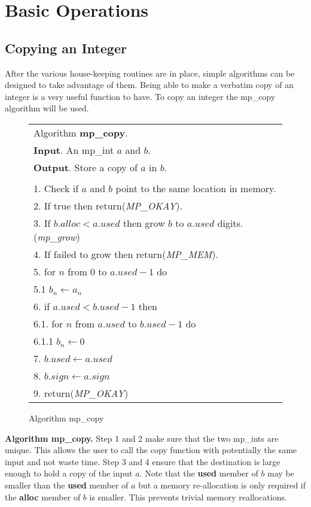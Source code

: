 \documentclass[b5paper]{book}
\begin{document}
\chapter{Basic Operations}
\section{Copying an Integer}
After the various house-keeping routines are in place, simple algorithms can be designed to take advantage of them.  Being able
to make a verbatim copy of an integer is a very useful function to have.  To copy an integer the mp\_copy algorithm will be used.

\newpage\begin{figure}[here]
\begin{center}
\begin{tabular}{l}
\hline Algorithm \textbf{mp\_copy}. \\
\textbf{Input}.  An mp\_int $a$ and $b$. \\
\textbf{Output}.  Store a copy of $a$ in $b$. \\
\hline \\
1.  Check if $a$ and $b$ point to the same location in memory. \\
2.  If true then return(\textit{MP\_OKAY}). \\
3.  If $b.alloc < a.used$ then grow $b$ to $a.used$ digits.  (\textit{mp\_grow}) \\
4.  If failed to grow then return(\textit{MP\_MEM}). \\
5.  for $n$ from 0 to $a.used - 1$ do \\
\hspace{3mm}5.1  $b_{n} \leftarrow a_{n}$ \\
6.  if $a.used < b.used - 1$ then \\ 
\hspace{3mm}6.1.  for $n$ from $a.used$ to $b.used - 1$ do \\
\hspace{6mm}6.1.1  $b_{n} \leftarrow 0$ \\
7.  $b.used \leftarrow a.used$ \\
8.  $b.sign \leftarrow a.sign$ \\
9.  return(\textit{MP\_OKAY}) \\
\hline
\end{tabular}
\end{center}
\caption{Algorithm mp\_copy}
\end{figure}

\textbf{Algorithm mp\_copy.}
Step 1 and 2 make sure that the two mp\_ints are unique.  This allows the user to call the copy function with
potentially the same input and not waste time.  Step 3 and 4 ensure that the destination is large enough to
hold a copy of the input $a$.  Note that the \textbf{used} member of $b$ may be smaller than the \textbf{used}
member of $a$ but a memory re-allocation is only required if the \textbf{alloc} member of $b$ is smaller.  This
prevents trivial memory reallocations.
\end{document}
